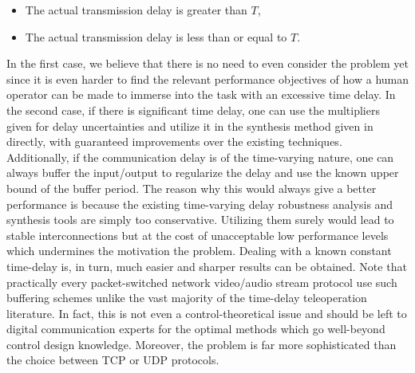 \begin{itemize}
	\item The actual transmission delay is greater than $T$,
    \item The actual transmission delay is less than or equal to $T$.
\end{itemize}

In the first case, we believe that there is no need to even consider the problem yet since it is even harder to find the relevant 
performance objectives of how a human operator can be made to immerse into the task with an excessive time delay. In the second case, 
if there is significant time delay, one can use the multipliers given  for delay uncertainties and utilize it in the 
synthesis method given in  directly, with guaranteed improvements over the existing techniques. Additionally, if the 
communication delay is of the time-varying nature, one can always buffer the input/output to regularize the delay and use the known upper 
bound of the buffer period. The reason why this would always give a better performance is because the existing time-varying delay robustness 
analysis and synthesis tools are simply too conservative. Utilizing them surely would lead to stable interconnections but at the cost of 
unacceptable low performance levels which undermines the motivation the problem. Dealing with a known constant time-delay is, in turn, 
much easier and sharper results can be obtained. Note that practically every packet-switched network video/audio stream protocol use such 
buffering schemes unlike the vast majority of the time-delay teleoperation literature. In fact, this is not even a control-theoretical 
issue and should be left to digital communication experts for the optimal methods which go well-beyond control design knowledge. Moreover, 
the problem is far more sophisticated than the choice between TCP or UDP protocols. 

